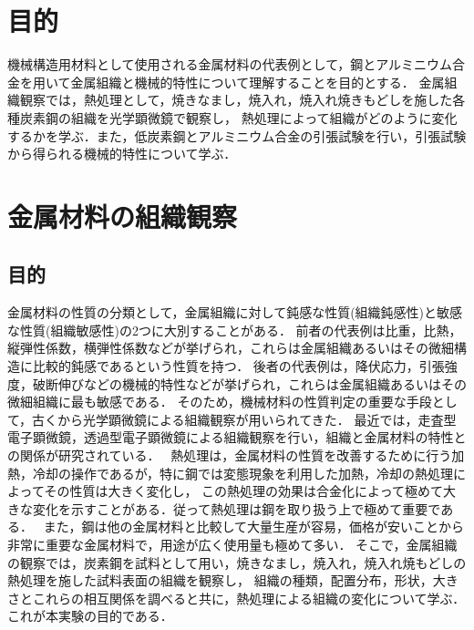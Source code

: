 \documentclass[a4paper,11pt,uplatex]{jsarticle}
\begin{document}
\section{目的}
機械構造用材料として使用される金属材料の代表例として，鋼とアルミニウム合金を用いて金属組織と機械的特性について理解することを目的とする．
金属組織観察では，熱処理として，焼きなまし，焼入れ，焼入れ焼きもどしを施した各種炭素鋼の組織を光学顕微鏡で観察し，
熱処理によって組織がどのように変化するかを学ぶ．また，低炭素鋼とアルミニウム合金の引張試験を行い，引張試験から得られる機械的特性について学ぶ．

\section{金属材料の組織観察}
\subsection{目的}
金属材料の性質の分類として，金属組織に対して鈍感な性質(組織鈍感性)と敏感な性質(組織敏感性)の2つに大別することがある．
前者の代表例は比重，比熱，縦弾性係数，横弾性係数などが挙げられ，これらは金属組織あるいはその微細構造に比較的鈍感であるという性質を持つ．
後者の代表例は，降伏応力，引張強度，破断伸びなどの機械的特性などが挙げられ，これらは金属組織あるいはその微細組織に最も敏感である．
そのため，機械材料の性質判定の重要な手段として，古くから光学顕微鏡による組織観察が用いられてきた．
最近では，走査型電子顕微鏡，透過型電子顕微鏡による組織観察を行い，組織と金属材料の特性との関係が研究されている．　
熱処理は，金属材料の性質を改善するために行う加熱，冷却の操作であるが，特に鋼では変態現象を利用した加熱，冷却の熱処理によってその性質は大きく変化し，
この熱処理の効果は合金化によって極めて大きな変化を示すことがある．従って熱処理は鋼を取り扱う上で極めて重要である．　
また，鋼は他の金属材料と比較して大量生産が容易，価格が安いことから非常に重要な金属材料で，用途が広く使用量も極めて多い．
そこで，金属組織の観察では，炭素鋼を試料として用い，焼きなまし，焼入れ，焼入れ焼もどしの熱処理を施した試料表面の組織を観察し，
組織の種類，配置分布，形状，大きさとこれらの相互関係を調べると共に，熱処理による組織の変化について学ぶ．これが本実験の目的である．
\end{document}
